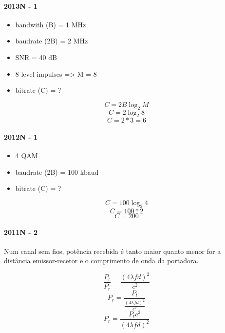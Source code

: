 \documentclass[../resumosRCOM.tex]{subfiles}
\begin{document}
\paragraph{2013N - 1}
\begin{itemize}
    \item bandwith (B) = 1 MHz
    \item baudrate (2B) = 2 MHz
    \item SNR = 40 dB
    \item 8 level impulses => M = 8
    \item bitrate (C) = ?
\end{itemize}

\[C = 2B\log_2 M\]
\[C = 2\log_2 8\]
\[C = 2*3 = 6\]

\paragraph{2012N - 1}
\begin{itemize}
    \item 4 QAM
    \item baudrate (2B) = 100 kbaud
    \item bitrate (C) = ?
\end{itemize}

\[C = 100\log_2 4\]
\[C = 100*2\]
\[C = 200\]

\paragraph{2011N - 2}
Num canal sem fios, potência recebida é tanto maior quanto menor for a distância emissor-recetor e o comprimento de onda
da portadora.

\[\frac{P_t}{P_r}=\frac{(4\lambda fd)^2}{c^2}\]
\[P_r=\frac{P_t}{\frac{(4\lambda fd)^2}{c^2}}\]
\[P_r=\frac{P_tc^2}{(4\lambda fd)^2}\]
\end{document}
